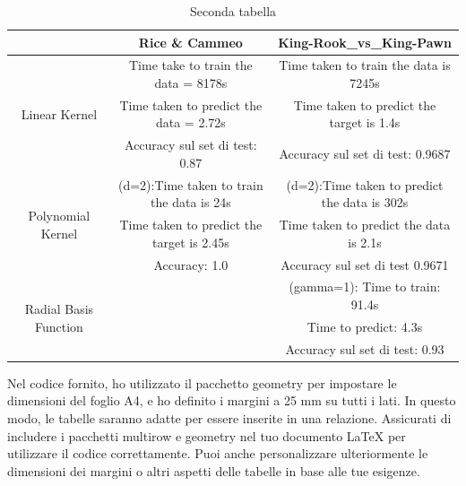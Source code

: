 \documentclass{article}
\begin{document}
  \begin{table}[htbp]
	\centering
	\begin{tabular}{|c|c|c|}
	  \hline
	  \multicolumn{1}{|c|}{} & \multicolumn{1}{c|}{Rice \& Cammeo} & \multicolumn{1}{c|}{King-Rook\_vs\_King-Pawn} \\
	  \hline
	  \multirow{3}{*}{Linear Kernel} & Time take to train the data = 8178s   & Time taken to train the data is 7245s\\
	  & Time taken to predict the data = 2.72s & Time taken to predict the target is 1.4s\\
	  & Accuracy sul set di test: 0.87 & Accuracy sul set di test: 0.9687\\
	  \hline
	  \multirow{3}{*}{Polynomial Kernel} & (d=2):Time taken to train the data is 24s& (d=2):Time taken to predict the data is 302s \\
	  & Time taken to predict the target is 2.45s& Time taken to predict the data is 2.1s\\
	  & Accuracy: 1.0 & Accuracy sul set di test 0.9671\\
	  \hline
	  \multirow{3}{*}{Radial Basis Function} &&(gamma=1): Time to train: 91.4s\\
	  && Time to predict: 4.3s \\
	  && Accuracy sul set di test: 0.93 \\
	  \hline
	\end{tabular}
	\caption{Seconda tabella}
  \end{table}
	Nel codice fornito, ho utilizzato il pacchetto geometry per impostare le dimensioni del foglio A4, e ho definito i margini a 25 mm su tutti i lati. In questo modo, le tabelle saranno adatte per essere inserite in una relazione.
	Assicurati di includere i pacchetti multirow e geometry nel tuo documento LaTeX per utilizzare il codice correttamente. Puoi anche personalizzare ulteriormente le dimensioni dei margini o altri aspetti delle tabelle in base alle tue esigenze.
\end{document}

